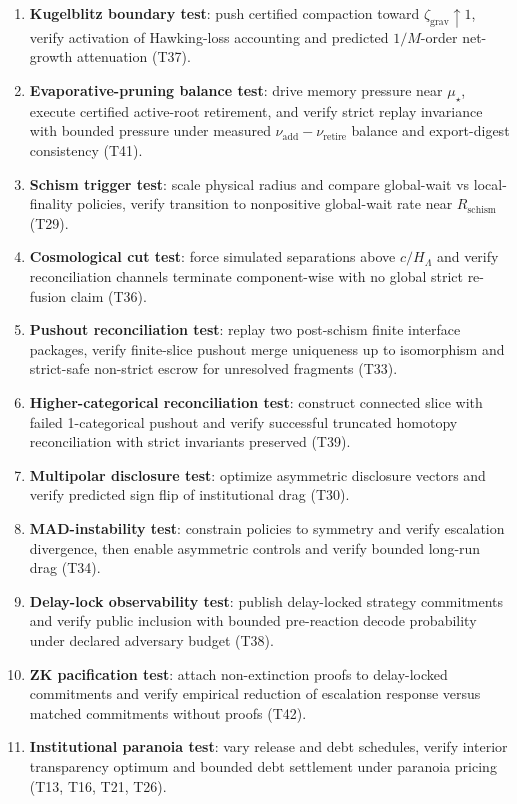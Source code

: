 \documentclass[11pt,a4paper]{article}
\theoremstyle{definition}
\theoremstyle{remark}
\begin{document}
\begin{enumerate}
  \item \textbf{Kugelblitz boundary test}: push certified compaction toward $\zeta_{\mathrm{grav}}\uparrow 1$, verify activation of Hawking-loss accounting and predicted $1/M$-order net-growth attenuation (T37).
  \item \textbf{Evaporative-pruning balance test}: drive memory pressure near $\mu_\star$, execute certified active-root retirement, and verify strict replay invariance with bounded pressure under measured $\nu_{\mathrm{add}}-\nu_{\mathrm{retire}}$ balance and export-digest consistency (T41).
  \item \textbf{Schism trigger test}: scale physical radius and compare global-wait vs local-finality policies, verify transition to nonpositive global-wait rate near $R_{\mathrm{schism}}$ (T29).
  \item \textbf{Cosmological cut test}: force simulated separations above $c/H_\Lambda$ and verify reconciliation channels terminate component-wise with no global strict re-fusion claim (T36).
  \item \textbf{Pushout reconciliation test}: replay two post-schism finite interface packages, verify finite-slice pushout merge uniqueness up to isomorphism and strict-safe non-strict escrow for unresolved fragments (T33).
  \item \textbf{Higher-categorical reconciliation test}: construct connected slice with failed 1-categorical pushout and verify successful truncated homotopy reconciliation with strict invariants preserved (T39).
  \item \textbf{Multipolar disclosure test}: optimize asymmetric disclosure vectors and verify predicted sign flip of institutional drag (T30).
  \item \textbf{MAD-instability test}: constrain policies to symmetry and verify escalation divergence, then enable asymmetric controls and verify bounded long-run drag (T34).
  \item \textbf{Delay-lock observability test}: publish delay-locked strategy commitments and verify public inclusion with bounded pre-reaction decode probability under declared adversary budget (T38).
  \item \textbf{ZK pacification test}: attach non-extinction proofs to delay-locked commitments and verify empirical reduction of escalation response versus matched commitments without proofs (T42).
  \item \textbf{Institutional paranoia test}: vary release and debt schedules, verify interior transparency optimum and bounded debt settlement under paranoia pricing (T13, T16, T21, T26).

\end{enumerate}
\end{document}
